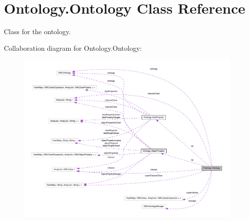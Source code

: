 \hypertarget{class_ontology_1_1_ontology}{
\section{Ontology.Ontology Class Reference}
\label{class_ontology_1_1_ontology}
}


Class for the ontology.  




Collaboration diagram for Ontology.Ontology:\nopagebreak
\begin{figure}[H]
\begin{center}
\leavevmode
\includegraphics[width=400pt]{class_ontology_1_1_ontology__coll__graph}
\end{center}
\end{figure}
